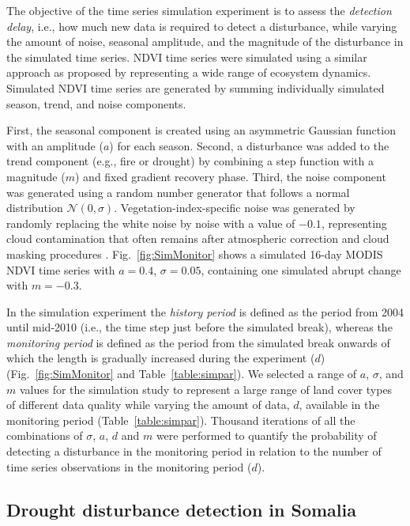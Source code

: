 \documentclass[authoryear,preprint,review,10pt]{elsarticle}
\begin{document}
The objective of the time series simulation experiment is to assess the \emph{detection delay}, i.e., how much new data is required to detect a disturbance,
while varying the amount of noise, seasonal amplitude, and the magnitude of the disturbance in the simulated time series. NDVI time series were simulated
using a similar approach as proposed by  \citet{Verbesselt:2010wo} representing a wide range of ecosystem dynamics. Simulated NDVI time series are generated by summing individually simulated season, trend, and noise components. 

First, the seasonal component is created using an asymmetric Gaussian function with an amplitude ($a$) for each season. Second, a disturbance was added to
the trend component (e.g., fire or drought) by combining a step function with a magnitude ($m$) and fixed gradient recovery phase. Third, the noise component
was generated using a random number generator that follows a normal distribution $\mathcal{N}(0, \sigma)$. Vegetation-index-specific noise was generated by randomly replacing the white noise by noise with a value of $-0.1$, representing cloud contamination that often remains after atmospheric correction and cloud masking procedures \citep[see][for more details]{Verbesselt:2010wo}. Fig.~\ref{fig:SimMonitor} shows a simulated 16-day MODIS NDVI time series with $a = 0.4$, $\sigma = 0.05$, containing one simulated abrupt change with $m = -0.3$.

In the simulation experiment the \emph{history period} is defined as the period from 2004 until mid-2010 (i.e., the time step just before the simulated break), whereas the \emph{monitoring period} is defined as the period from the simulated break onwards of which the length is gradually increased during the experiment ($d$) (Fig.~\ref{fig:SimMonitor} and Table~\ref{table:simpar}). We selected a range of $a$, $\sigma$, and $m$ values for the simulation study to represent a large range of land cover types of different data quality while varying the amount of data, $d$, available in the monitoring period (Table~\ref{table:simpar}). Thousand iterations of all the combinations of $\sigma$, $a$, $d$ and $m$ were performed to quantify the probability of detecting a disturbance in the monitoring period in relation to the number of time series observations in the monitoring period ($d$).

\subsection{Drought disturbance detection in Somalia}\label{sec:RealData}
\end{document}
